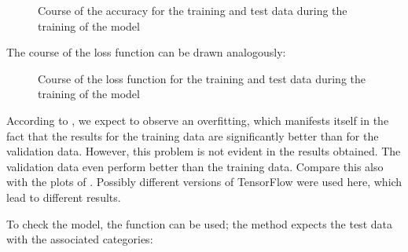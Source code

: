 \medskip






\medskip

\begin{figure}[H]
    \caption{Course of the accuracy for the training and test data during the training of the model}\label{TensorFlowIrisPlotHist1}
\end{figure}

The course of the loss function can be drawn analogously:

\medskip






\medskip

\begin{figure}[H]
    \caption{Course of the loss function for the training and test data during the training of the model}\label{TensorFlowIrisPlotHist2}
\end{figure}

According to \cite{KDnuggets.07.12.2020}, we expect to observe an overfitting, which manifests itself in the fact that the results for the training data are significantly better than for the validation data. However, this problem is not evident in the results obtained. The validation data even perform better than the training data. Compare this also with the plots of \cite{KDnuggets.07.12.2020}. Possibly different versions of TensorFlow were used here, which lead to different results.

To check the model, the function  can be used; the method expects the test data with the associated categories:

\medskip


